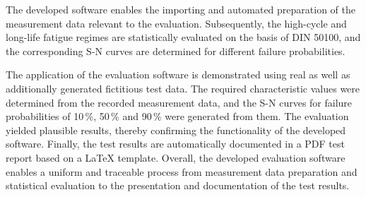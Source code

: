 The developed software enables the importing and automated preparation of the measurement data relevant to the evaluation. Subsequently, the high-cycle and long-life fatigue regimes are statistically evaluated on the basis of DIN 50100, and the corresponding S-N curves are determined for different failure probabilities. 

The application of the evaluation software is demonstrated using real as well as additionally generated fictitious test data. The required characteristic values were determined from the recorded measurement data, and the S-N curves for failure probabilities of 10\,\%, 50\,\% and 90\,\% were generated from them. The evaluation yielded plausible results, thereby confirming the functionality of the developed software. Finally, the test results are automatically documented in a PDF test report based on a LaTeX template. Overall, the developed evaluation software enables a uniform and traceable process from measurement data preparation and statistical evaluation to the presentation and documentation of the test results.


\vfill
\cleardoublepage

\setcounter{tocdepth}{2}
\tableofcontents %

\cleardoublepage



\vfill
\cleardoubleemptypage

